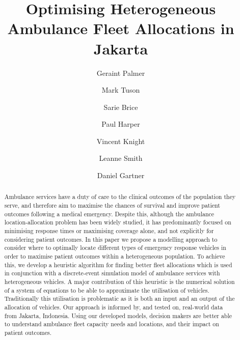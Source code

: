 \documentclass[preprint,12pt]{elsarticle}
\begin{document}
\begin{frontmatter}


\title{Optimising Heterogeneous Ambulance Fleet Allocations in Jakarta}

\author[inst1]{Geraint Palmer}
\author[inst1]{Mark Tuson}
\author[inst1]{Sarie Brice}
\author[inst1]{Paul Harper}
\author[inst1]{Vincent Knight}
\author[inst2]{Leanne Smith}
\author[inst1,inst3]{Daniel Gartner}


            



 \begin{abstract}
 Ambulance services have a duty of care to the clinical outcomes of the
 population they serve, and therefore aim to maximise the chances of survival
 and improve patient outcomes following a medical emergency. Despite this,
 although the ambulance location-allocation problem has been widely studied,
 it has predominantly focused on minimising response times or maximising
 coverage alone, and not explicitly for considering patient outcomes. In this
 paper we propose a modelling approach to consider where to optimally locate
 different types of emergency response vehicles in order to maximise patient
 outcomes within a heterogeneous population. To achieve this, we develop a
 heuristic algorithm for finding better fleet allocations which is used in
 conjunction with a discrete-event simulation model of ambulance services with
 heterogeneous vehicles. A major contribution of this heuristic is the numerical
 solution of a system of equations to be able to approximate the utilisation of
 vehicles. Traditionally this utilisation is problematic as it is both an input
 and an output of the allocation of vehicles. Our approach is informed by, and
 tested on, real-world data from Jakarta, Indonesia. Using our developed models,
 decision makers are better able to understand ambulance fleet capacity needs
 and locations, and their impact on patient outcomes.


\end{abstract}
\end{frontmatter}
\end{document}
